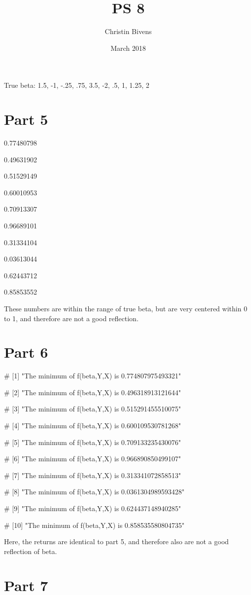 \documentclass{article}
\title{PS 8}
\author{Christin Bivens}
\date{March 2018}
\begin{document}
\maketitle

True beta:
1.5, -1, -.25, .75, 3.5, -2, .5, 1, 1.25, 2

\section{Part 5}

	
0.77480798

0.49631902

0.51529149

0.60010953

0.70913307

0.96689101

0.31334104

0.03613044

0.62443712

0.85853552


These numbers are within the range of true beta, but are very centered within 0 to 1, and therefore are not a good reflection.


\section{Part 6}

# [1] "The minimum of f(beta,Y,X) is 0.774807975493321" 

# [2] "The minimum of f(beta,Y,X) is 0.496318913121644" 

# [3] "The minimum of f(beta,Y,X) is 0.515291455510075" 

# [4] "The minimum of f(beta,Y,X) is 0.600109530781268" 

# [5] "The minimum of f(beta,Y,X) is 0.709133235430076" 

# [6] "The minimum of f(beta,Y,X) is 0.966890850499107" 

# [7] "The minimum of f(beta,Y,X) is 0.313341072858513" 

# [8] "The minimum of f(beta,Y,X) is 0.0361304989593428"

# [9] "The minimum of f(beta,Y,X) is 0.624437148940285" 

# [10] "The minimum of f(beta,Y,X) is 0.858535580804735"

Here, the returns are identical to part 5, and therefore also are not a good reflection of beta.

\section{Part 7}
\end{document}
